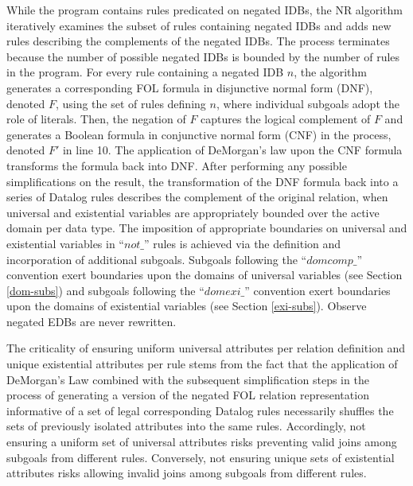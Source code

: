While the program contains rules predicated on negated IDBs, the NR algorithm iteratively examines the subset of rules containing negated IDBs and adds new rules describing the complements of the negated IDBs. The process terminates because the number of possible negated IDBs is bounded by the number of rules in the program. For every rule containing a negated IDB $n$, the algorithm generates a corresponding FOL formula in disjunctive normal form (DNF), denoted $F$, using the set of rules defining $n$, where individual subgoals adopt the role of literals. Then, the negation of $F$ captures the logical complement of $F$ and generates a Boolean formula in conjunctive normal form (CNF) in the process, denoted $F'$ in line 10. The application of DeMorgan's law upon the CNF formula transforms the formula back into DNF. After performing any possible simplifications on the result, the transformation of the DNF formula back into a series of Datalog rules describes the complement of the original relation, when universal and existential variables are appropriately bounded over the active domain per data type. The imposition of appropriate boundaries on universal and existential variables in ``$not\_$'' rules is achieved via the definition and incorporation of additional subgoals. Subgoals following the ``$domcomp\_$'' convention exert boundaries upon the domains of universal variables (see Section \ref{dom-subs}) and subgoals following the ``$domexi\_$'' convention exert boundaries upon the domains of existential variables (see Section \ref{exi-subs}). Observe negated EDBs are never rewritten.

The criticality of ensuring uniform universal attributes per relation definition and unique existential attributes per rule stems from the fact that the application of DeMorgan's Law combined with the subsequent simplification steps in the process of generating a version of the negated FOL relation representation informative of a set of legal corresponding Datalog rules necessarily shuffles the sets of previously isolated attributes into the same rules. Accordingly, not ensuring a uniform set of universal attributes risks preventing valid joins among subgoals from different rules. Conversely, not ensuring unique sets of existential attributes risks allowing invalid joins among subgoals from different rules.

